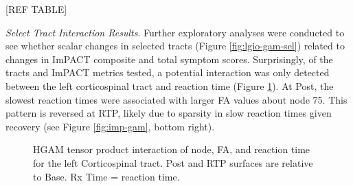\documentclass[12pt]{article}
\begin{document}
[REF TABLE]

\textit{Select Tract Interaction Results}. Further exploratory analyses were conducted to see whether scalar changes in selected tracts (Figure \ref{fig:lgio-gam-sel}) related to changes in ImPACT composite and total symptom scores. Surprisingly, of the tracts and ImPACT metrics tested, a potential interaction was only detected between the left corticospinal tract and reaction time (Figure \ref{fig:lgio-intx-lcs}). At Post, the slowest reaction times were associated with larger FA values about node 75. This pattern is reversed at RTP, likely due to sparsity in slow reaction times given recovery (see Figure \ref{fig:imp-gam}, bottom right).

\begin{figure}[H]
	\centering
	\caption{HGAM tensor product interaction of node, FA, and reaction time for the left Corticospinal tract. Post and RTP surfaces are relative to Base. Rx Time = reaction time.}
	\label{fig:lgio-intx-lcs}
\end{figure}
\end{document}
